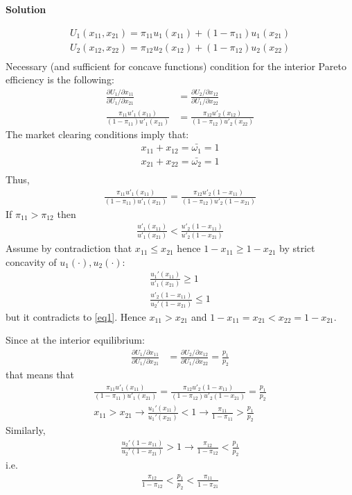 \documentclass[a4paper]{article}
\begin{document}
\textbf{Solution}

\begin{align*}
U_1(x_{11}, x_{21}) = \pi_{11}u_1(x_{11}) + (1 - \pi_{11}) u_1(x_{21})\\
U_2(x_{12}, x_{22}) = \pi_{12}u_2(x_{12}) + (1 - \pi_{12}) u_2(x_{22})\\
\end{align*}
Necessary (and sufficient for concave functions) condition for the interior Pareto efficiency is the following:
\begin{align*}
\frac{\partial U_1/\partial x_{11}}{\partial U_1/\partial x_{21}} &= \frac{\partial U_2/\partial x_{12}}{\partial U_1/\partial x_{22}}\\
\frac{\pi_{11}u'_1(x_{11})}{(1-\pi_{11})u'_1(x_{21})} &= \frac{\pi_{12}u'_2(x_{12})}{(1-\pi_{12})u'_2(x_{22})}
\end{align*}
The market clearing conditions imply that:
\begin{align*}
x_{11} + x_{12} = \bar{\omega_1} = 1\\
x_{21} + x_{22} = \bar{\omega_2} = 1\\
\end{align*}
Thus, 
\begin{align*}
\frac{\pi_{11}u'_1(x_{11})}{(1-\pi_{11})u'_1(x_{21})} = \frac{\pi_{12}u'_2(1 - x_{11})}{(1-\pi_{12})u'_2(1-x_{21})}
\end{align*}
If $\pi_{11} > \pi_{12}$ then 
\begin{align}\label{eq1}
\frac{u'_1(x_{11})}{u'_1(x_{21})} < \frac{u'_2(1-x_{11})}{u'_2(1 - x_{21})}
\end{align}
Assume by contradiction that $x_{11} \le x_{21}$ hence $1-x_{11} \ge 1 - x_{21}$ by strict concavity of $u_1(\cdot), u_2(\cdot)$:
\begin{align*}
\frac{u_1'(x_{11})}{u'_1(x_{21})} \ge 1\\
\frac{u'_2(1 - x_{11})}{u_2'(1 - x_{21})} \le 1
\end{align*}
but it contradicts to \eqref{eq1}. Hence $x_{11} > x_{21}$ and $1 - x_{11} = x_{21} < x_{22} = 1 - x_{21}$.


Since at the interior equilibrium:
\begin{align*}
\frac{\partial U_1/\partial x_{11}}{\partial U_1/\partial x_{21}} &= \frac{\partial U_2/\partial x_{12}}{\partial U_1/\partial x_{22}} = \frac{p_1}{p_2}
\end{align*}
that means that
\begin{align*}
\frac{\pi_{11}u'_1(x_{11})}{(1-\pi_{11})u'_1(x_{21})} = \frac{\pi_{12}u'_2(1 - x_{11})}{(1-\pi_{12})u'_2(1-x_{21})} = \frac{p_1}{p_2}\\
x_{11} > x_{21} \to \frac{u_1'(x_{11})}{u_1'(x_{21})} < 1 \to \frac{\pi_{11}}{1 - \pi_{11}} > \frac{p_1}{p_2}
\end{align*}
Similarly, 
\begin{align*}
\frac{u_2'(1 - x_{11})}{u_2'(1 - x_{21})} > 1 \to \frac{\pi_{12}}{1 - \pi_{12}} < \frac{p_1}{p_2}
\end{align*}
i.e.
\begin{align*}
\frac{\pi_{12}}{1 - \pi_{12}} < \frac{p_1}{p_2} < \frac{\pi_{11}}{1 - \pi_{21}}
\end{align*}
\end{document}
